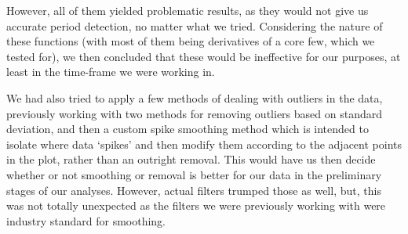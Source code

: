 \documentclass[conference]{IEEEtran}
\begin{document}
However, all of them yielded problematic results, as they would not give us accurate period detection, no matter what we tried. Considering the nature of these functions (with most of them being derivatives of a core few, which we tested for), we then concluded that these would be ineffective for our purposes, at least in the time-frame we were working in.

We had also tried to apply a few methods of dealing with outliers in the data, previously working with two methods for removing outliers based on standard deviation, and then a custom spike smoothing method which is intended to isolate where data ‘spikes’ and then modify them according to the adjacent points in the plot, rather than an outright removal. This would have us then decide whether or not smoothing or removal is better for our data in the preliminary stages of our analyses. However, actual filters trumped those as well, but, this was not totally unexpected as the filters we were previously working with were industry standard for smoothing. 
\end{document}
